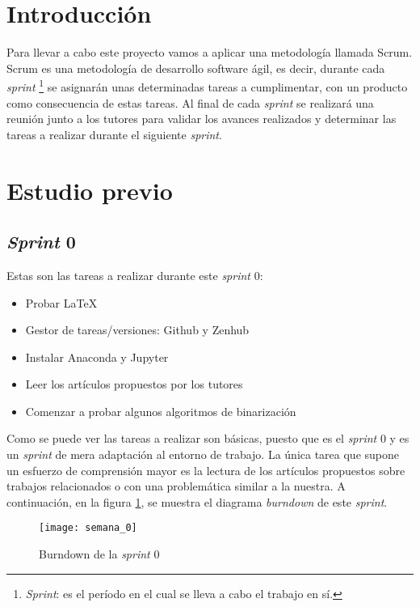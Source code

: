 
\section{Introducción}


Para llevar a cabo este proyecto vamos a aplicar una metodología llamada Scrum. Scrum es una metodología de desarrollo software ágil, es decir, durante cada \textit{sprint} \footnote{\textit{Sprint}: es el período en el cual se lleva a cabo el trabajo en sí.\cite{wiki:scrum}} se asignarán unas determinadas tareas a cumplimentar, con un producto como consecuencia de estas tareas. Al final de cada \textit{sprint} se realizará una reunión junto a los tutores para validar los avances realizados y determinar las tareas a realizar durante el siguiente \textit{sprint}.

\section{Estudio previo}

\subsection{\textit{Sprint} 0}
Estas son las tareas a realizar durante este \textit{sprint} 0:

\begin{itemize}
	\item Probar \LaTeX
	\item Gestor de tareas/versiones: Github y Zenhub
	\item Instalar Anaconda y Jupyter
	\item Leer los artículos propuestos por los tutores
	\item Comenzar a probar algunos algoritmos de binarización
\end{itemize}

Como se puede ver las tareas a realizar son básicas, puesto que es el \textit{sprint} 0 y es un \textit{sprint} de mera adaptación al entorno de trabajo. La única tarea que supone un esfuerzo de comprensión mayor es la lectura de los artículos propuestos sobre trabajos relacionados o con una problemática similar a la nuestra. A continuación, en la figura \ref{fig:A.1.1}, se muestra el diagrama \textit{burndown} de este \textit{sprint}. 

\begin{figure}[h]
\centering
\texttt{[image: semana\_0]}
\caption{Burndown de la \textit{sprint} 0}
\label{fig:A.1.1}
\end{figure}

